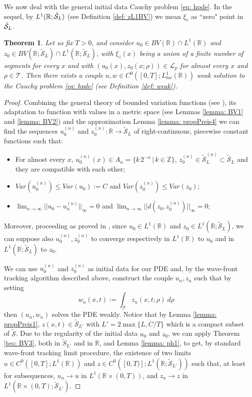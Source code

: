 \documentclass[12pt]{article}
\newcommand{\R}{\mathbb{R}}
\newcommand{\LL}{\mathcal{L}}
\newcommand{\T}{\mathcal{T}}
\newcommand{\p}{\rho}
\newcommand{\1}{\mathds{1}}
\newtheorem{teo}{Theorem}[section]
\theoremstyle{definition}
\begin{document}
We now deal with the general initial data Cauchy problem \eqref{eq: hpde}. In the sequel, by $L^1(\mathbb{R};\tilde{\cal S}_L)$ (see Definition \ref{def: zL1BV}) we mean $\xi_v$ as ``zero" point in $\tilde{\cal S}_L$.

\begin{teo}\label{teo: esistenza}
    Let us fix $T>0$, and consider $u_0 \in BV(\R)\cap L^1(\R)$ and $z_0\in BV(\R;\tilde{\mathcal S}_L)\cap L^1(\R; \tilde{\mathcal S}_L)$, with $\xi_z(x)$ being a union of a finite number of segments for every $x$ and with $(u_0(x),z_0(x;\p))\in \LL_p$ for almost every $x$ and $\p \in \T$. Then there exists a couple $u,w\in C^0([0,T]; L^1_{loc}(\R))$ weak solution to the Cauchy problem \eqref{eq: hpde} (see Definition \ref{def: weak}). 
\end{teo}
\begin{proof}
    Combining the general theory of bounded variation functions (see \cite[Chapter~2]{AB3}), its adaptation to function with values in a metric space (see Lemmas \ref{lemma: BV1} and \ref{lemma: BV2}) and the approximation Lemma \ref{lemma: propPreis4} we can find the sequences $u_0^{(n)}$ and $z_0^{(n)} : \R \to \tilde{\mathcal S}_L$ of right-continuous, piecewise constant functions such that:   
     \begin{itemize}
        \item For almost every $x$, $u_0^{(n)}(x) \in A_n=\{k\,2^{-n}\,|\, k\in \mathbb Z\}$, $z_0^{(n)}\in \tilde{\mathcal S}_L^{(n)}\subset \tilde{\mathcal S}_L$ and they are compatible with each other; 
        \item $Var(u_0^{(n)})\leq Var(u_0):=C$ and $Var(z_0^{(n)})\leq Var(z_0)$;
        \item $ \lim_{n\to \infty} || u_0-u_n^{(n)}||_\infty =0$ and $\lim_{n\to \infty} ||d(z_0,z_0^{(n)})||_\infty = 0 $; 
    \end{itemize}
    Moreover, proceeding as proved in \cite[Chapter~3]{AB3}, since $u_0\in L^1(\R)$ and $z_0\in L^1(\R;\tilde{\mathcal S}_L)$, we can suppose also $u_0^{(n)}, z_0^{(n)}$ to converge respectively in $L^1(\R)$ to $u_0$ and in $L^1(\R;\tilde{\mathcal S}_L)$ to $z_0$.
    \par We can use $u_0^{(n)}$ and $z_0^{(n)}$ as initial data for our PDE and, by the wave-front tracking algorithm described above, construct the couple $u_n,z_n$ such that by setting \[w_n(x,t):=\int_{\T} z_n(x,t;\p) ~d\p\] then $(u_n,w_n)$ solves the PDE weakly. Notice that by Lemma \ref{lemma: propPreis1}, $z(x,t)\in \tilde{\mathcal S}_{L'}$ with $L'=2 \max\{L,C/T\}$ which is a compact subset of $\tilde{\mathcal S}$. Due to the regularity of the initial data $u_0$ and $z_0$, we can apply Theorem \ref{teo: BV3}, both in $\tilde S_{L'}$ and in $\mathbb{R}$, and Lemma \ref{lemma: ph1}, to get, by standard wave-front tracking limit procedure, the existence of two limits $u\in C^0([0,T];L^1(\R))$ and $z \in C^0([0,T)]; L^1(\R;\tilde{\mathcal S}_{L'}))$ such that, at least for subsequences, $u_n \to u$ in $L^1(\R\times (0,T))$, and $z_n\to z$ in $L^1(\R\times (0,T); \tilde{\mathcal S}_{L'})$. 

\end{proof}
\end{document}
